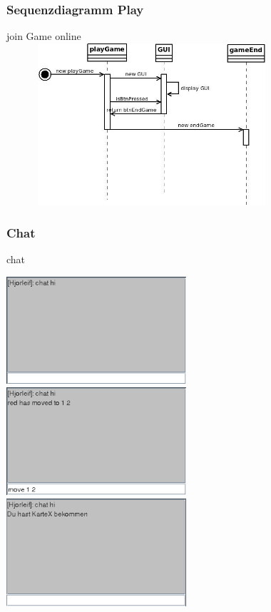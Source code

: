 \documentclass{beamer}
\begin{document}
	    \label{Frame5}	
		\begin{frame}
			\frametitle{Sequenzdiagramm Play}
			\begin{block}{join Game online}
				\includegraphics[width = 10.8cm, height = 6cm]{aufgabe1/SequenzdiagrammPlay.jpeg}
			\end{block}		
		\end{frame}


	    \label{Frame6}	
		\begin{frame}
			\frametitle{Chat}
			\begin{block}{chat}
				\begin{center}
				\includegraphics[width=0.5\textwidth]{chat/chat_hi.png}\\
				\includegraphics[width=0.5\textwidth]{chat/move.png}
				\includegraphics[width=0.5\textwidth]{chat/deal.png}
			\end{center}
			\end{block}		
		\end{frame}
\end{document}
